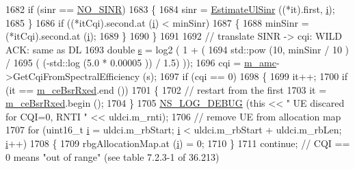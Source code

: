 \begin{DoxyCode}
1682               \textcolor{keywordflow}{if} (sinr == \hyperlink{cqa-ff-mac-scheduler_8h_a520d71777be043568160c783a9c65fd5}{NO\_SINR})
1683                 \{
1684                   sinr = \hyperlink{classns3_1_1FdBetFfMacScheduler_aba60aa765c817c48c8030c66aa642426}{EstimateUlSinr} ((*it).first, \hyperlink{bernuolliDistribution_8m_a6f6ccfcf58b31cb6412107d9d5281426}{i});
1685                 \}
1686               \textcolor{keywordflow}{if} ((*itCqi).second.at (\hyperlink{bernuolliDistribution_8m_a6f6ccfcf58b31cb6412107d9d5281426}{i}) < minSinr)
1687                 \{
1688                   minSinr = (*itCqi).second.at (\hyperlink{bernuolliDistribution_8m_a6f6ccfcf58b31cb6412107d9d5281426}{i});
1689                 \}
1690             \}
1691 
1692           \textcolor{comment}{// translate SINR -> cqi: WILD ACK: same as DL}
1693           \textcolor{keywordtype}{double} \hyperlink{generate__test__data__lte__sinr_8m_ad83eeb3a142285d1243a08c6b7026df8}{s} = log2 ( 1 + (
1694                               std::pow (10, minSinr / 10 )  /
1695                               ( (-std::log (5.0 * 0.00005 )) / 1.5) ));
1696           cqi = \hyperlink{classns3_1_1FdBetFfMacScheduler_ab6734e88a03f8d5085607802a0b49bbb}{m\_amc}->GetCqiFromSpectralEfficiency (s);
1697           \textcolor{keywordflow}{if} (cqi == 0)
1698             \{
1699               it++;
1700               \textcolor{keywordflow}{if} (it == \hyperlink{classns3_1_1FdBetFfMacScheduler_a86411f2dd593676d88de396ef4d0b6e5}{m\_ceBsrRxed}.end ())
1701                 \{
1702                   \textcolor{comment}{// restart from the first}
1703                   it = \hyperlink{classns3_1_1FdBetFfMacScheduler_a86411f2dd593676d88de396ef4d0b6e5}{m\_ceBsrRxed}.begin ();
1704                 \}
1705               \hyperlink{group__logging_ga413f1886406d49f59a6a0a89b77b4d0a}{NS\_LOG\_DEBUG} (\textcolor{keyword}{this} << \textcolor{stringliteral}{" UE discared for CQI=0, RNTI "} << uldci.m\_rnti);
1706               \textcolor{comment}{// remove UE from allocation map}
1707               \textcolor{keywordflow}{for} (uint16\_t \hyperlink{bernuolliDistribution_8m_a6f6ccfcf58b31cb6412107d9d5281426}{i} = uldci.m\_rbStart; \hyperlink{bernuolliDistribution_8m_a6f6ccfcf58b31cb6412107d9d5281426}{i} < uldci.m\_rbStart + uldci.m\_rbLen; 
      \hyperlink{bernuolliDistribution_8m_a6f6ccfcf58b31cb6412107d9d5281426}{i}++)
1708                 \{
1709                   rbgAllocationMap.at (\hyperlink{bernuolliDistribution_8m_a6f6ccfcf58b31cb6412107d9d5281426}{i}) = 0;
1710                 \}
1711               \textcolor{keywordflow}{continue}; \textcolor{comment}{// CQI == 0 means "out of range" (see table 7.2.3-1 of 36.213)}

\end{DoxyCode}

